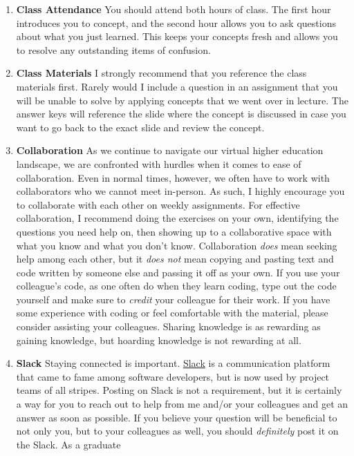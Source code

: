 \documentclass[11pt,]{article}
\begin{document}
\begin{enumerate}
\def\labelenumi{\arabic{enumi}.}
\item
  \textbf{Class Attendance} You should attend both hours of class. The
  first hour introduces you to concept, and the second hour allows you
  to ask questions about what you just learned. This keeps your concepts
  fresh and allows you to resolve any outstanding items of confusion.
\item
  \textbf{Class Materials} I strongly recommend that you reference the
  class materials first. Rarely would I include a question in an
  assignment that you will be unable to solve by applying concepts that
  we went over in lecture. The answer keys will reference the slide
  where the concept is discussed in case you want to go back to the
  exact slide and review the concept.
\item
  \textbf{Collaboration} As we continue to navigate our virtual higher
  education landscape, we are confronted with hurdles when it comes to
  ease of collaboration. Even in normal times, however, we often have to
  work with collaborators who we cannot meet in-person. As such, I
  highly encourage you to collaborate with each other on weekly
  assignments. For effective collaboration, I recommend doing the
  exercises on your own, identifying the questions you need help on,
  then showing up to a collaborative space with what you know and what
  you don't know. Collaboration \emph{does} mean seeking help among each
  other, but it \emph{does not} mean copying and pasting text and code
  written by someone else and passing it off as your own. If you use
  your colleague's code, as one often do when they learn coding, type
  out the code yourself and make sure to \emph{credit} your colleague
  for their work. If you have some experience with coding or feel
  comfortable with the material, please consider assisting your
  colleagues. Sharing knowledge is as rewarding as gaining knowledge,
  but hoarding knowledge is not rewarding at all.
\item
  \textbf{Slack} Staying connected is important.
  \href{https://slack.com/}{Slack} is a communication platform that came
  to fame among software developers, but is now used by project teams of
  all stripes. Posting on Slack is not a requirement, but it is
  certainly a way for you to reach out to help from me and/or your
  colleagues and get an answer as soon as possible. If you believe your
  question will be beneficial to not only you, but to your colleagues as
  well, you should \emph{definitely} post it on the Slack. As a graduate

\end{enumerate}
\end{document}
